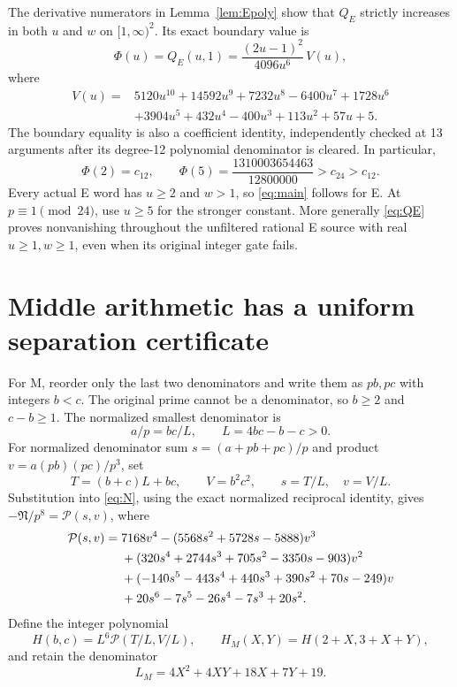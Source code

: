 The derivative numerators in Lemma~\ref{lem:Epoly} show that $Q_E$ strictly
increases in both $u$ and $w$ on $[1,\infty)^2$. Its exact boundary value is
\begin{equation}\label{eq:Phi}
 \Phi(u)=Q_E(u,1)=\frac{(2u-1)^2}{4096u^6}\,V(u),
\end{equation}
where
\begin{align*}
V(u)={}&5120u^{10}+14592u^9+7232u^8-6400u^7+1728u^6\\
&+3904u^5+432u^4-400u^3+113u^2+57u+5.
\end{align*}
The boundary equality is also a coefficient identity, independently checked
at 13 arguments after its degree-12 polynomial denominator is cleared.
In particular,
\[
 \Phi(2)=c_{12},\qquad
 \Phi(5)=\frac{1310003654463}{12800000}>c_{24}>c_{12}.
\]
Every actual E word has $u\ge2$ and $w>1$, so \eqref{eq:main} follows for E.
At $p\equiv1\pmod{24}$, use $u\ge5$ for the stronger constant. More generally
\eqref{eq:QE} proves nonvanishing throughout the unfiltered rational E source
with real $u\ge1,w\ge1$, even when its original integer gate fails.

\section{Middle arithmetic has a uniform separation certificate}
For M, reorder only the last two denominators and write them as $pb,pc$ with
integers $b<c$. The original prime cannot be a denominator, so $b\ge2$ and
$c-b\ge1$. The normalized smallest denominator is
\[
 a/p=bc/L,\qquad L=4bc-b-c>0.
\]
For normalized denominator sum $s=(a+pb+pc)/p$ and product
$v=a(pb)(pc)/p^3$, set
\[
 T=(b+c)L+bc,\qquad V=b^2c^2,\qquad s=T/L,\quad v=V/L.
\]
Substitution into \eqref{eq:N}, using the exact normalized reciprocal identity,
gives $-\mathfrak N/p^8=\mathcal P(s,v)$, where
\begin{align}\label{eq:PM}
\mathcal P(s,v)={}&7168v^4-(5568s^2+5728s-5888)v^3\notag\\
&+(320s^4+2744s^3+705s^2-3350s-903)v^2\notag\\
&+(-140s^5-443s^4+440s^3+390s^2+70s-249)v\notag\\
&+20s^6-7s^5-26s^4-7s^3+20s^2.
\end{align}
Define the integer polynomial
\[
 H(b,c)=L^6\mathcal P(T/L,V/L),\qquad
 H_M(X,Y)=H(2+X,3+X+Y),
\]
and retain the denominator
\[
 L_M=4X^2+4XY+18X+7Y+19.
\]

